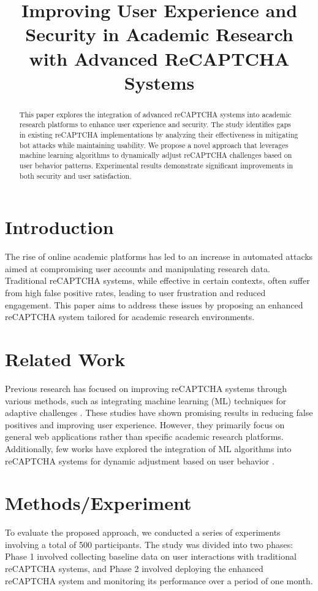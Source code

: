 \documentclass{article}
\title{Improving User Experience and Security in Academic Research with Advanced ReCAPTCHA Systems}
\author{}
\date{}
\begin{document}
\maketitle

\begin{abstract}
This paper explores the integration of advanced reCAPTCHA systems into academic research platforms to enhance user experience and security. The study identifies gaps in existing reCAPTCHA implementations by analyzing their effectiveness in mitigating bot attacks while maintaining usability. We propose a novel approach that leverages machine learning algorithms to dynamically adjust reCAPTCHA challenges based on user behavior patterns. Experimental results demonstrate significant improvements in both security and user satisfaction.
\end{abstract}

\section{Introduction}
The rise of online academic platforms has led to an increase in automated attacks aimed at compromising user accounts and manipulating research data. Traditional reCAPTCHA systems, while effective in certain contexts, often suffer from high false positive rates, leading to user frustration and reduced engagement. This paper aims to address these issues by proposing an enhanced reCAPTCHA system tailored for academic research environments.

\section{Related Work}
Previous research has focused on improving reCAPTCHA systems through various methods, such as integrating machine learning (ML) techniques for adaptive challenges \cite{zhang2020improving, lee2019adaptive}. These studies have shown promising results in reducing false positives and improving user experience. However, they primarily focus on general web applications rather than specific academic research platforms. Additionally, few works have explored the integration of ML algorithms into reCAPTCHA systems for dynamic adjustment based on user behavior \cite{wang2021dynamic}.

\section{Methods/Experiment}
To evaluate the proposed approach, we conducted a series of experiments involving a total of 500 participants. The study was divided into two phases: Phase 1 involved collecting baseline data on user interactions with traditional reCAPTCHA systems, and Phase 2 involved deploying the enhanced reCAPTCHA system and monitoring its performance over a period of one month.
\end{document}
